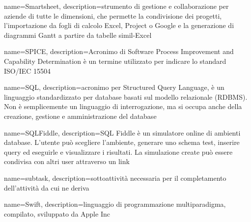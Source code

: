 {
	name=Smartsheet,
	description={strumento di gestione e collaborazione per aziende di tutte le dimensioni, che permette la condivisione dei progetti, l'importazione da fogli di calcolo Excel, Project o Google e la generazione di diagrammi Gantt a partire da tabelle simil-Excel}
}

{
	name=SPICE,
	description={Acronimo di Software Process Improvement and Capability Determination è un termine utilizzato per indicare lo standard ISO/IEC 15504}
}

{
	name=SQL,
	description={acronimo per Structured Query Language, è un linguaggio standardizzato per database basati sul modello relazionale (RDBMS). Non è semplicemente un linguaggio di interrogazione, ma si occupa anche della creazione, gestione e amministrazione del database}
}

{
	name=SQLFiddle,
	description={SQL Fiddle è un simulatore online di ambienti database. L'utente può scegliere l'ambiente, generare uno schema test, inserire query ed eseguirle e visualizzare i risultati. La simulazione create può essere condivisa con altri user attraverso un link}
}

{
	name=subtask,
	description={sottoattività necessaria per il completamento dell'attività da cui ne deriva}
}

{
	name=Swift,
	description={linguaggio di programmazione multiparadigma, compilato, sviluppato da Apple Inc}
}
